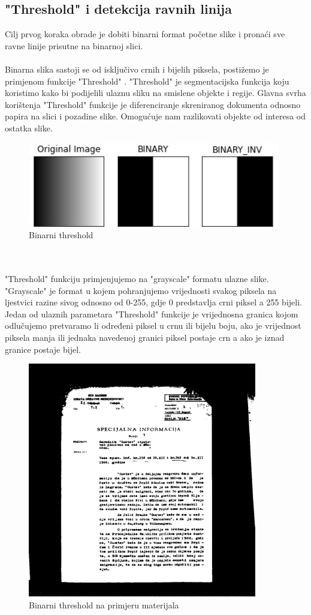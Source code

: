 \documentclass[times, utf8, zavrsni, numeric]{fer}
\begin{document}
\subsection{"Threshold" i detekcija ravnih linija}
Cilj prvog koraka obrade je dobiti binarni format početne slike i pronaći sve ravne linije prisutne na binarnoj slici. 
\\
\\
Binarna slika sastoji se od isključivo crnih i bijelih piksela, postižemo je primjenom funkcije "Threshold" \cite{OpenCVadaptive}. "Threshold" je segmentacijska funkcija koju koristimo kako bi podijelili ulaznu sliku na smislene objekte i regije. Glavna svrha korištenja "Threshold" funkcije je diferenciranje skreniranog dokumenta odnosno papira na slici i pozadine slike. Omogućuje nam razlikovati objekte od interesa od ostatka slike. 
\begin{figure}[htb]
	\centering
	\includegraphics[width=11cm]{images/binary_threshold.jpg}
	\caption{Binarni threshold}
	\label{fig:binary_example}
\end{figure}
\\
\\
"Threshold" funkciju primjenjujemo na "grayscale" formatu ulazne slike. "Grayscale" je format u kojem pohranjujemo vrijednosti svakog piksela na ljestvici razine sivog odnosno od 0-255, gdje 0 predstavlja crni piksel a 255 bijeli. Jedan od ulaznih parametara "Threshold" funkcije je vrijednosna granica kojom odlučujemo pretvaramo li određeni piksel u crnu ili bijelu boju, ako je vrijednost piksela manja ili jednaka navedenoj granici piksel postaje crn a ako je iznad granice postaje bijel.


\begin{figure}[htb]
	\centering
	\includegraphics[width=10cm]{images/dataset_binary.jpg}
	\caption{Binarni threshold na primjeru materijala}
	\label{fig:dataset_binary_example}
\end{figure}
\end{document}
